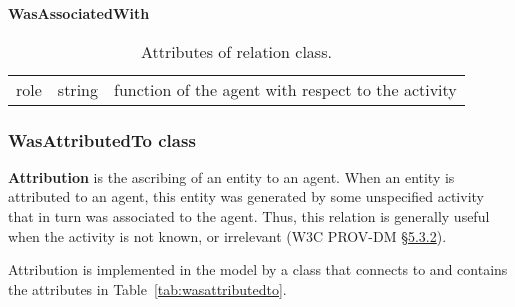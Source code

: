 \begin{table}[ht]
\small
{}\textwidth
\textbf{\normalsize WasAssociatedWith}\vspace{0.25em}\\
\begin{tabulary}{1.0\textwidth}{llL}
\toprule
{} &  & \\
\midrule
role & string   & function of the agent with respect to the activity\\
\bottomrule
\end{tabulary}
\caption[Attributes of  relation class]{Attributes of  relation class.}
\label{tab:wasassociatedwith}
\end{table}


\subsubsection{WasAttributedTo class}

\textbf{Attribution} is the ascribing of an entity to an agent. When an entity is attributed to an agent, this entity was generated by some unspecified activity that in turn was associated to the agent. Thus, this relation is generally useful when the activity is not known, or irrelevant (W3C PROV-DM \href{https://www.w3.org/TR/prov-dm/#term-attribution}{\S5.3.2}). 


Attribution is implemented in the model by a class  that connects  to  and contains the attributes in Table~\ref{tab:wasattributedto}.

